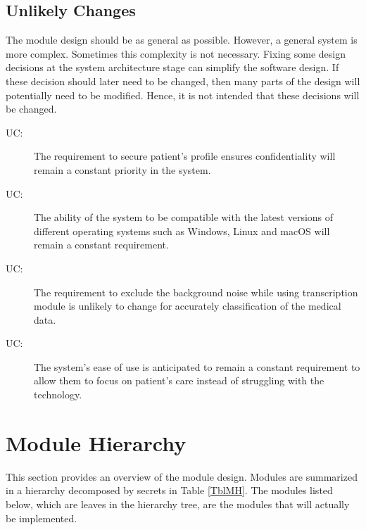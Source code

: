 \documentclass[12pt, titlepage]{article}
\newcounter{ucnum}
\newcommand{\uctheucnum}{UC\theucnum}
\begin{document}
\subsection{Unlikely Changes} \label{SecUchange}

The module design should be as general as possible. However, a general system is
more complex. Sometimes this complexity is not necessary. Fixing some design
decisions at the system architecture stage can simplify the software design. If
these decision should later need to be changed, then many parts of the design
will potentially need to be modified. Hence, it is not intended that these
decisions will be changed.

\begin{description}
\item[ \uctheucnum \label{ucSecure}:] The requirement to secure patient's profile ensures confidentiality will remain a constant priority in the system.
\item[ \uctheucnum \label{ucCompatible}:] The ability of the system to be compatible with the latest versions of different operating systems such as Windows, Linux and macOS will remain a constant requirement.
\item[ \uctheucnum \label{ucnoisefree}:] The requirement to exclude the background noise while using transcription module is unlikely to change for accurately classification of the medical data.
\item[ \uctheucnum \label{uceaseofuse}:] The system's ease of use is anticipated to remain a constant requirement to allow them to focus on patient's care instead of struggling with the technology. 
\end{description}

\section{Module Hierarchy} \label{SecMH}

This section provides an overview of the module design. Modules are summarized in a hierarchy decomposed by secrets in Table \ref{TblMH}. The modules listed below, which are leaves in the hierarchy tree, are the modules that will actually be implemented.
\end{document}
